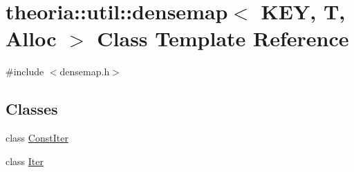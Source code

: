 \hypertarget{classtheoria_1_1util_1_1densemap}{}\section{theoria\+:\+:util\+:\+:densemap$<$ K\+EY, T, Alloc $>$ Class Template Reference}
\label{classtheoria_1_1util_1_1densemap}


{\ttfamily \#include $<$densemap.\+h$>$}

\subsection*{Classes}
\begin{DoxyCompactItemize}
\item 
class \hyperlink{classtheoria_1_1util_1_1densemap_1_1ConstIter}{Const\+Iter}
\item 
class \hyperlink{classtheoria_1_1util_1_1densemap_1_1Iter}{Iter}
\end{DoxyCompactItemize}
